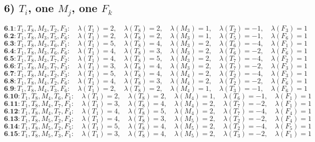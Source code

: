 \documentclass[12p]{article}
\numberwithin{equation}{section}
\begin{document}
\subsection*{6) $T_i$, one $M_j$, one $F_k$}
\[
\textbf{6.1}: T_1, T_8, M_3, T_2, F_3:\quad \lambda(T_1) = 2,\quad \lambda(T_8) = 2,\quad \lambda(M_3) = 1,\quad \lambda(T_2) = -1,\quad \lambda(F_3) = 1
\]
\[
\textbf{6.2}: T_1, T_8, M_3, T_5, F_6:\quad \lambda(T_1) = 2,\quad \lambda(T_8) = 2,\quad \lambda(M_3) = 1,\quad \lambda(T_5) = -1,\quad \lambda(F_6) = 1
\]
\[
\textbf{6.3}: T_1, T_8, M_3, T_6, F_1:\quad \lambda(T_1) = 5,\quad \lambda(T_8) = 4,\quad \lambda(M_3) = 2,\quad \lambda(T_6) = -4,\quad \lambda(F_1) = 1
\]
\[
\textbf{6.4}: T_1, T_8, M_3, T_6, F_6:\quad \lambda(T_1) = 4,\quad \lambda(T_8) = 3,\quad \lambda(M_3) = 2,\quad \lambda(T_6) = -2,\quad \lambda(F_6) = 1
\]
\[
\textbf{6.5}: T_1, T_8, M_3, T_7, F_2:\quad \lambda(T_1) = 4,\quad \lambda(T_8) = 5,\quad \lambda(M_3) = 2,\quad \lambda(T_7) = -4,\quad \lambda(F_2) = 1
\]
\[
\textbf{6.6}: T_1, T_8, M_3, T_7, F_3:\quad \lambda(T_1) = 3,\quad \lambda(T_8) = 4,\quad \lambda(M_3) = 2,\quad \lambda(T_7) = -2,\quad \lambda(F_3) = 1
\]
\[
\textbf{6.7}: T_1, T_8, M_4, T_2, F_3:\quad \lambda(T_1) = 5,\quad \lambda(T_8) = 4,\quad \lambda(M_4) = 2,\quad \lambda(T_2) = -4,\quad \lambda(F_3) = 1
\]
\[
\textbf{6.8}: T_1, T_8, M_4, T_2, F_6:\quad \lambda(T_1) = 4,\quad \lambda(T_8) = 3,\quad \lambda(M_4) = 2,\quad \lambda(T_2) = -2,\quad \lambda(F_6) = 1
\]
\[
\textbf{6.9}: T_1, T_8, M_4, T_3, F_6:\quad \lambda(T_1) = 2,\quad \lambda(T_8) = 2,\quad \lambda(M_4) = 1,\quad \lambda(T_3) = -1,\quad \lambda(F_6) = 1
\]
\[
\textbf{6.10}: T_1, T_8, M_4, T_6, F_1:\quad \lambda(T_1) = 2,\quad \lambda(T_8) = 2,\quad \lambda(M_4) = 1,\quad \lambda(T_6) = -1,\quad \lambda(F_1) = 1
\]
\[
\textbf{6.11}: T_1, T_8, M_4, T_7, F_1:\quad \lambda(T_1) = 3,\quad \lambda(T_8) = 4,\quad \lambda(M_4) = 2,\quad \lambda(T_7) = -2,\quad \lambda(F_1) = 1
\]
\[
\textbf{6.12}: T_1, T_8, M_4, T_7, F_4:\quad \lambda(T_1) = 4,\quad \lambda(T_8) = 5,\quad \lambda(M_4) = 2,\quad \lambda(T_7) = -4,\quad \lambda(F_4) = 1
\]
\[
\textbf{6.13}: T_1, T_8, M_5, T_2, F_4:\quad \lambda(T_1) = 4,\quad \lambda(T_8) = 3,\quad \lambda(M_5) = 2,\quad \lambda(T_2) = -2,\quad \lambda(F_4) = 1
\]
\[
\textbf{6.14}: T_1, T_8, M_5, T_2, F_5:\quad \lambda(T_1) = 5,\quad \lambda(T_8) = 4,\quad \lambda(M_5) = 2,\quad \lambda(T_2) = -4,\quad \lambda(F_5) = 1
\]
\[
\textbf{6.15}: T_1, T_8, M_5, T_3, F_1:\quad \lambda(T_1) = 3,\quad \lambda(T_8) = 4,\quad \lambda(M_5) = 2,\quad \lambda(T_3) = -2,\quad \lambda(F_1) = 1
\]
\end{document}
